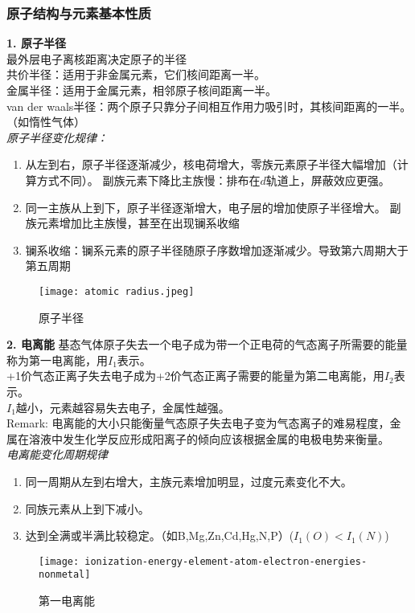 \documentclass[utf8,a4paper,12pt]{ctexart}
\begin{document}
\subsubsection{原子结构与元素基本性质}
{\bf 1. 原子半径}\\
最外层电子离核距离决定原子的半径\\
共价半径：适用于非金属元素，它们核间距离一半。\\
金属半径：适用于金属元素，相邻原子核间距离一半。\\
van der waals半径：两个原子只靠分子间相互作用力吸引时，其核间距离的一半。（如惰性气体）\\
\emph{原子半径变化规律：}
\begin{enumerate}[1)]
\item 从左到右，原子半径逐渐减少，核电荷增大，零族元素原子半径大幅增加（计算方式不同）。
副族元素下降比主族慢：排布在$d$轨道上，屏蔽效应更强。
\item 同一主族从上到下，原子半径逐渐增大，电子层的增加使原子半径增大。
副族元素增加比主族慢，甚至在出现镧系收缩
\item 镧系收缩：镧系元素的原子半径随原子序数增加逐渐减少。导致第六周期大于第五周期
\end{enumerate}
\begin{figure}[H]
\centering
\texttt{[image: atomic radius.jpeg]}
\caption{原子半径}
\end{figure}
{\bf 2. 电离能}
基态气体原子失去一个电子成为带一个正电荷的气态离子所需要的能量称为第一电离能，用$I_1$表示。\\
+1价气态正离子失去电子成为+2价气态正离子需要的能量为第二电离能，用$I_2$表示。\\
$I_1$越小，元素越容易失去电子，金属性越强。\\
Remark: 电离能的大小只能衡量气态原子失去电子变为气态离子的难易程度，金属在溶液中发生化学反应形成阳离子的倾向应该根据金属的电极电势来衡量。\\
\emph{电离能变化周期规律}
\begin{enumerate}[1)]
\item 同一周期从左到右增大，主族元素增加明显，过度元素变化不大。
\item 同族元素从上到下减小。
\item 达到全满或半满比较稳定。（如B,Mg,Zn,Cd,Hg,N,P）($I_1(O)<I_1(N)$)
\end{enumerate}
\begin{figure}[H]
\centering
\texttt{[image: ionization-energy-element-atom-electron-energies-nonmetal]}
\caption{第一电离能}
\end{figure}
\end{document}
